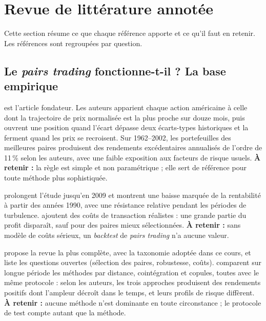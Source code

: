 \section{Revue de littérature annotée}\label{c0:litt}

Cette section résume ce que chaque référence apporte et ce qu'il faut en retenir. Les références sont regroupées par question.

\subsection{Le \emph{pairs trading} fonctionne-t-il ? La base empirique}

\citet{gatev2006} est l'article fondateur. Les auteurs apparient chaque action américaine à celle dont la trajectoire de prix normalisée est la plus proche sur douze mois, puis ouvrent une position quand l'écart dépasse deux écarts-types historiques et la ferment quand les prix se recroisent. Sur 1962–2002, les portefeuilles des meilleures paires produisent des rendements excédentaires annualisés de l'ordre de 11\,\% selon les auteurs, avec une faible exposition aux facteurs de risque usuels. \textbf{À retenir :} la règle est simple et non paramétrique ; elle sert de référence pour toute méthode plus sophistiquée.

\citet{dofaff2010} prolongent l'étude jusqu'en 2009 et montrent une baisse marquée de la rentabilité à partir des années 1990, avec une résistance relative pendant les périodes de turbulence. \citet{dofaff2012} ajoutent des coûts de transaction réalistes : une grande partie du profit disparaît, sauf pour des paires mieux sélectionnées. \textbf{À retenir :} sans modèle de coûts sérieux, un \emph{backtest} de \emph{pairs trading} n'a aucune valeur.

\citet{krauss2017survey} propose la revue la plus complète, avec la taxonomie adoptée dans ce cours, et liste les questions ouvertes (sélection des paires, robustesse, coûts). \citet{rad2016} comparent sur longue période les méthodes par distance, cointégration et copules, toutes avec le même protocole : selon les auteurs, les trois approches produisent des rendements positifs dont l'ampleur décroît dans le temps, et leurs profils de risque diffèrent. \textbf{À retenir :} aucune méthode n'est dominante en toute circonstance ; le protocole de test compte autant que la méthode.

